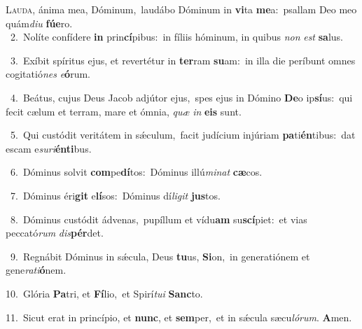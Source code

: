 \lettrine{\initial\textcolor{\initialcolor}{L}}{auda,} ánima mea, Dóminum,~\dagger laudábo Dóminum in \textbf{vi}\-ta \textbf{me}\-a:~\star psallam Deo meo quám\-\textit{di}\-\textit{u} \textbf{fú}\-\textbf{e}ro.\\
{\numbfont\textcolor{\numbcolor}{~2.}}~Nolíte confídere \textbf{in} prin\-\textbf{cí}\-pibus:~\star in fíliis hóminum, in quibus \textit{non} \textit{est} \textbf{sa}\-lus.\par
{\numbfont\textcolor{\numbcolor}{~3.}}~Exíbit spíritus ejus, et revertétur in \textbf{ter}\-ram \textbf{su}\-am:~\star in illa die períbunt omnes cogitatió\textit{nes} \textit{e}\-\textbf{ó}rum.\par
{\numbfont\textcolor{\numbcolor}{~4.}}~Beátus, cujus Deus Jacob adjútor ejus,~\dagger spes ejus in Dómino \textbf{De}\-o ip\-\textbf{sí}\-us:~\star qui fecit cælum et terram, mare et ómnia, \textit{quæ} \textit{in} \textbf{e}\-\textbf{is} sunt.\par
{\numbfont\textcolor{\numbcolor}{~5.}}~Qui custódit veritátem in sǽculum,~\dagger facit judícium injúriam \textbf{pa}\-ti\-\textbf{én}\-tibus:~\star dat escam e\-\textit{su}\-\textit{ri}\textbf{én}\textbf{ti}bus.\par
{\numbfont\textcolor{\numbcolor}{~6.}}~Dóminus solvit \textbf{com}\-pe\-\textbf{dí}\-tos:~\star Dóminus illú\-\textit{mi}\-\textit{nat} \textbf{cæ}\-cos.\par
{\numbfont\textcolor{\numbcolor}{~7.}}~Dóminus éri\textbf{git} e\-\textbf{lí}\-sos:~\star Dóminus dí\-\textit{li}\-\textit{git} \textbf{jus}\-tos.\par
{\numbfont\textcolor{\numbcolor}{~8.}}~Dóminus custódit ádvenas,~\dagger pupíllum et vídu\textbf{am} su\-\textbf{scí}\-piet:~\star et vias peccató\textit{rum} \textit{dis}\-\textbf{pér}det.\par
{\numbfont\textcolor{\numbcolor}{~9.}}~Regnábit Dóminus in sǽcula, Deus \textbf{tu}\-us, \textbf{Si}\-on,~\star in generatiónem et gene\-\textit{ra}\-\textit{ti}\textbf{ó}nem.\par
{\numbfont\textcolor{\numbcolor}{10.}}~Glória \textbf{Pa}\-tri, et \textbf{Fí}\-lio,~\star et Spirí\-\textit{tu}\-\textit{i} \textbf{Sanc}\-to.\par
{\numbfont\textcolor{\numbcolor}{11.}}~Sicut erat in princípio, et \textbf{nunc}\-, et \textbf{sem}\-per,~\star et in sǽcula sæcu\-\textit{ló}\-\textit{rum}. \textbf{A}\-men.\par
